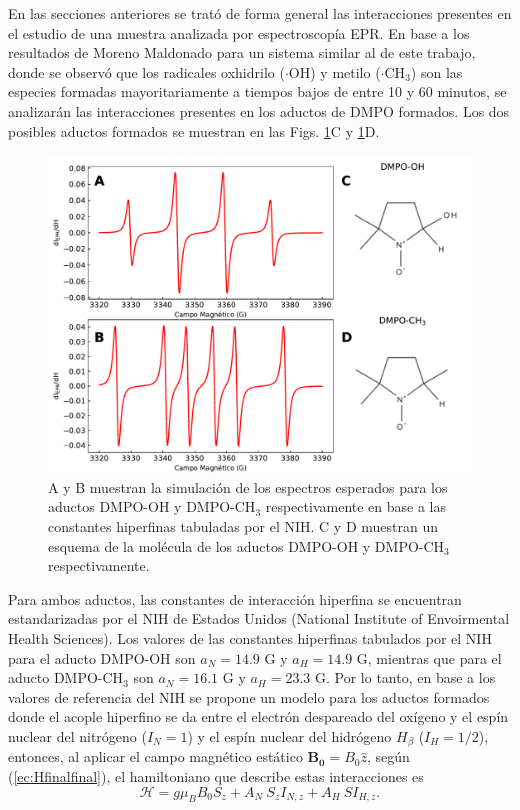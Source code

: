 \documentclass[aps,prl,reprint,superscriptaddress,showkeys]{revtex4-2}
\begin{document}
En las secciones anteriores se trató de forma general las interacciones presentes en el estudio de una muestra analizada por espectroscopía EPR. En base a los resultados de Moreno Maldonado \cite{maldonado_actividad_nodate} para un sistema similar al de este trabajo, donde se observó que los radicales oxhidrilo ($\cdot$OH) y metilo ($\cdot$CH$_3$) son las especies formadas mayoritariamente a tiempos bajos de entre 10 y 60 minutos, se analizarán las interacciones presentes en los aductos de DMPO formados. Los dos posibles aductos formados se muestran en las Figs. \ref*{fig:simulacion}C y \ref*{fig:simulacion}D. 

\begin{figure}[ht]
    \centering
    \includegraphics[width=1\linewidth]{simulacion.pdf}
    \caption{\centering  A y B muestran la simulación de los espectros esperados para los aductos DMPO-OH y DMPO-CH$_3$ respectivamente en base a las constantes hiperfinas tabuladas por el NIH. C y D muestran un esquema de la molécula de los aductos DMPO-OH y DMPO-CH$_3$ respectivamente. }
    \label{fig:simulacion}
\end{figure}

Para ambos aductos, las constantes de interacción hiperfina se encuentran estandarizadas por el NIH de Estados Unidos (National Institute of Envoirmental Health Sciences). Los valores de las constantes hiperfinas tabulados por el NIH para el aducto DMPO-OH son $a_N = 14.9$ G y $a_H = 14.9$ G, mientras que para el aducto DMPO-CH$_3$ son $a_N = 16.1$ G y $a_H = 23.3$ G. Por lo tanto, en base a los valores de referencia del NIH se propone un modelo para los aductos formados donde el acople hiperfino se da entre el electrón despareado del oxígeno y el espín nuclear del nitrógeno ($I_N = 1$) y el espín nuclear del hidrógeno $H_\beta$ ($I_H=1/2$), entonces, al aplicar el campo magnético estático $\mathbf{B_0} = B_0 \hat{z}$, según (\ref*{ec:Hfinalfinal}), el hamiltoniano que describe estas interacciones es 
\begin{equation}
    \mathcal{H} = g \mu_B B_0 S_z + A_N ~ S_z I_{N,z} + A_H ~ S I_{H,z}.
    \label{ec:HDMSO}
\end{equation}
\end{document}
